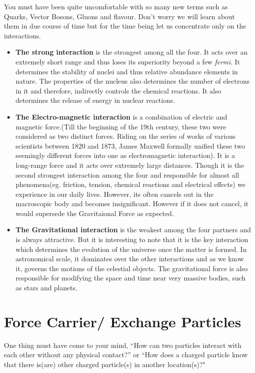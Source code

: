     \par You must have been quite uncomfortable with so many new terms such as Quarks, Vector Bosons, Gluons and flavour. Don't worry we will learn about them in due course of time but for the time being let us concentrate only on the interactions.
    \pagebreak\begin{itemize}
          \item\textbf{The strong interaction} is the strongest among all the four. It acts over an extremely short range and thus loses its superiority beyond a few \textit{fermi}. It determines the stability of nuclei and thus relative abundance elements in nature. The properties of the nucleus also determines the number of electrons in it and therefore, indirectly controls the chemical reactions. It also determines the release of energy in nuclear reactions.
          \item\textbf{The Electro-magnetic interaction} is a combination of electric and magnetic force.(Till the beginning of the 19th century, these two were considered as two distinct forces. Riding on the series of works of various scientists between 1820 and 1873, James Maxwell formally unified these two seemingly different forces into one as electromagnetic interaction). It is a long-range force and it acts over extremely large distances. Though it is the second strongest interaction among the four and responsible for almost all phenomena(eg. friction, tension, chemical reactions and electrical effects) we experience in our daily lives. However, its often cancels out in the macroscopic body and becomes insignificant. However if it does not cancel, it would supersede the Gravitaional Force as expected.
          \pagebreak\item\textbf{The Gravitational interaction} is the weakest among the four partners and is always attractive. But it is interesting to note that it is the key interaction which determines the evolution of the universe once the matter is formed. In astronomical scale, it dominates over the other interactions and as we know it, governs the motions of the celestial objects. The gravitational force is also responsible for modifying the space and time near very massive bodies, such as stars and planets.
        \end{itemize}
        
    \section{Force Carrier/ Exchange Particles}
    One thing must have come to your mind, ``How can two particles interact with each other without any physical contact?'' or ``How does a charged particle know that there is(are) other charged particle(s) in another location(s)?"
    

